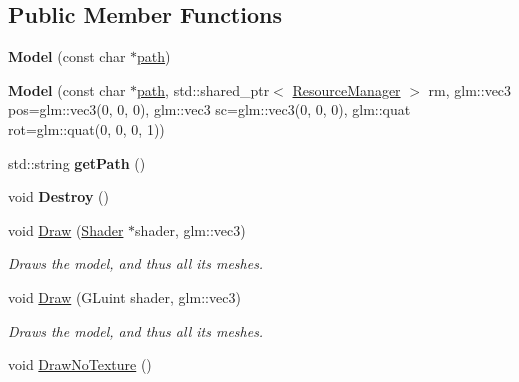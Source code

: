 \subsection*{Public Member Functions}
\begin{DoxyCompactItemize}
\item 
{\bfseries Model} (const char $\ast$\hyperlink{class_model_af94ddde9af2f1fcee96a5aca53e48ed1}{path})\hypertarget{class_model_a0c34749c25d878e0e00179911d2b6628}{}\label{class_model_a0c34749c25d878e0e00179911d2b6628}

\item 
{\bfseries Model} (const char $\ast$\hyperlink{class_model_af94ddde9af2f1fcee96a5aca53e48ed1}{path}, std\+::shared\+\_\+ptr$<$ \hyperlink{class_resource_manager}{Resource\+Manager} $>$ rm, glm\+::vec3 pos=glm\+::vec3(0, 0, 0), glm\+::vec3 sc=glm\+::vec3(0, 0, 0), glm\+::quat rot=glm\+::quat(0, 0, 0, 1))\hypertarget{class_model_a9e5fadef9ed39a2d3a2282b3e6d34524}{}\label{class_model_a9e5fadef9ed39a2d3a2282b3e6d34524}

\item 
std\+::string {\bfseries get\+Path} ()\hypertarget{class_model_a01308a0e5396f32afacefe1b1e39312d}{}\label{class_model_a01308a0e5396f32afacefe1b1e39312d}

\item 
void {\bfseries Destroy} ()\hypertarget{class_model_ad60ed0ed7eaa7dcdd58398e6efacc7c4}{}\label{class_model_ad60ed0ed7eaa7dcdd58398e6efacc7c4}

\item 
void \hyperlink{class_model_a2c0655ebc702a393808dad399b9e2381}{Draw} (\hyperlink{class_shader}{Shader} $\ast$shader, glm\+::vec3)\hypertarget{class_model_a2c0655ebc702a393808dad399b9e2381}{}\label{class_model_a2c0655ebc702a393808dad399b9e2381}

\begin{DoxyCompactList}\small\item\em Draws the model, and thus all its meshes. \end{DoxyCompactList}\item 
void \hyperlink{class_model_a87d25cae9e3685ebc02a50d0087f2d8e}{Draw} (G\+Luint shader, glm\+::vec3)\hypertarget{class_model_a87d25cae9e3685ebc02a50d0087f2d8e}{}\label{class_model_a87d25cae9e3685ebc02a50d0087f2d8e}

\begin{DoxyCompactList}\small\item\em Draws the model, and thus all its meshes. \end{DoxyCompactList}\item 
void \hyperlink{class_model_a03262c92e9aa1028a2df43eb53eaca67}{Draw\+No\+Texture} ()\hypertarget{class_model_a03262c92e9aa1028a2df43eb53eaca67}{}\label{class_model_a03262c92e9aa1028a2df43eb53eaca67}


\end{DoxyCompactItemize}
